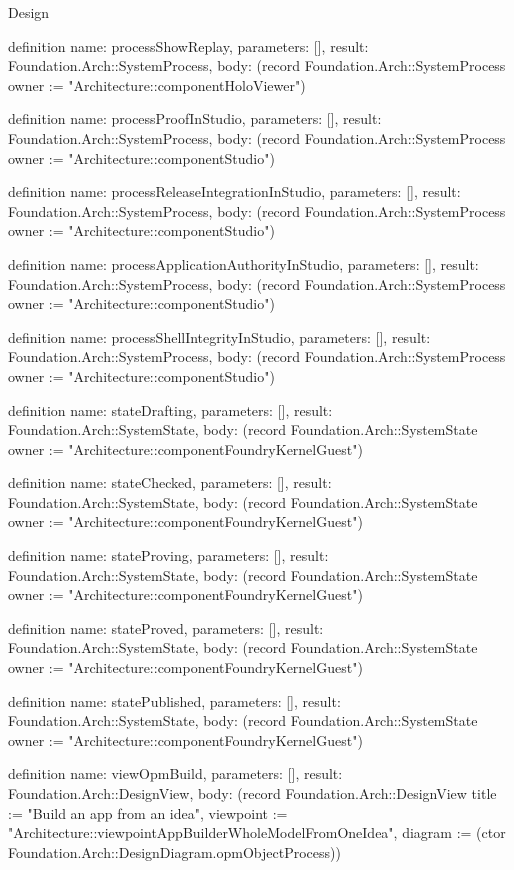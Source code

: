 \begin{lexlean}{Design}
\begin{semanticmodule}
definition{
  name: processShowReplay,
  parameters: [],
  result: Foundation.Arch::SystemProcess,
  body: (record Foundation.Arch::SystemProcess {owner := "Architecture::componentHoloViewer"})
}

definition{
  name: processProofInStudio,
  parameters: [],
  result: Foundation.Arch::SystemProcess,
  body: (record Foundation.Arch::SystemProcess {owner := "Architecture::componentStudio"})
}

definition{
  name: processReleaseIntegrationInStudio,
  parameters: [],
  result: Foundation.Arch::SystemProcess,
  body: (record Foundation.Arch::SystemProcess {owner := "Architecture::componentStudio"})
}

definition{
  name: processApplicationAuthorityInStudio,
  parameters: [],
  result: Foundation.Arch::SystemProcess,
  body: (record Foundation.Arch::SystemProcess {owner := "Architecture::componentStudio"})
}

definition{
  name: processShellIntegrityInStudio,
  parameters: [],
  result: Foundation.Arch::SystemProcess,
  body: (record Foundation.Arch::SystemProcess {owner := "Architecture::componentStudio"})
}

definition{
  name: stateDrafting,
  parameters: [],
  result: Foundation.Arch::SystemState,
  body: (record Foundation.Arch::SystemState {owner := "Architecture::componentFoundryKernelGuest"})
}

definition{
  name: stateChecked,
  parameters: [],
  result: Foundation.Arch::SystemState,
  body: (record Foundation.Arch::SystemState {owner := "Architecture::componentFoundryKernelGuest"})
}

definition{
  name: stateProving,
  parameters: [],
  result: Foundation.Arch::SystemState,
  body: (record Foundation.Arch::SystemState {owner := "Architecture::componentFoundryKernelGuest"})
}

definition{
  name: stateProved,
  parameters: [],
  result: Foundation.Arch::SystemState,
  body: (record Foundation.Arch::SystemState {owner := "Architecture::componentFoundryKernelGuest"})
}

definition{
  name: statePublished,
  parameters: [],
  result: Foundation.Arch::SystemState,
  body: (record Foundation.Arch::SystemState {owner := "Architecture::componentFoundryKernelGuest"})
}

definition{
  name: viewOpmBuild,
  parameters: [],
  result: Foundation.Arch::DesignView,
  body: (record Foundation.Arch::DesignView {title := "Build an app from an idea", viewpoint := "Architecture::viewpointAppBuilderWholeModelFromOneIdea", diagram := (ctor Foundation.Arch::DesignDiagram.opmObjectProcess)})
}


\end{semanticmodule}
\end{lexlean}
